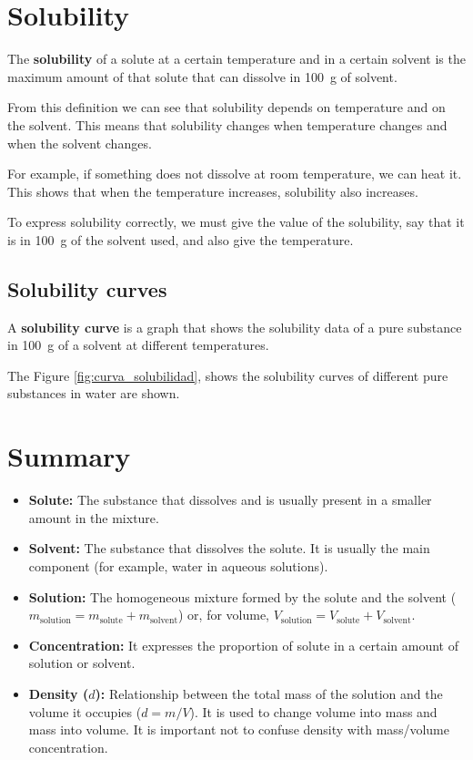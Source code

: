 \section{Solubility}

\begin{definition}[Solubility]
        The \textbf{solubility} of a solute at a certain temperature and in a certain solvent is the maximum amount of that solute that can dissolve in \qty{100}{\g} of solvent.
\end{definition}

From this definition we can see that solubility depends on temperature and on the solvent.
This means that solubility changes when temperature changes and when the solvent changes.

For example, if something does not dissolve at room temperature, we can heat it.
This shows that when the temperature increases, solubility also increases.

To express solubility correctly, we must give the value of the solubility, say that it is in \qty{100}{\g} of the solvent used, and also give the temperature.

\subsection{Solubility curves}\label{subsec:curvas-de-solubilidad}

A \textbf{solubility curve} is a graph that shows the solubility data of a pure substance in \qty{100}{\g} of a solvent at different temperatures.

The Figure \ref{fig:curva_solubilidad}, shows the solubility curves of different pure substances in water are shown.

\section*{Summary}
\begin{itemize}
    \item \textbf{Solute:} The substance that dissolves and is usually present in a smaller amount in the mixture.
    \item \textbf{Solvent:} The substance that dissolves the solute. It is usually the main component (for example, water in aqueous solutions).
    \item \textbf{Solution:} The homogeneous mixture formed by the solute and the solvent ($m_{\text{solution}} = m_{\text{solute}} + m_{\text{solvent}}$) or, for volume, \( V_{\text{solution}} = V_{\text{solute}} + V_{\text{solvent}} \).
    \item \textbf{Concentration:} It expresses the proportion of solute in a certain amount of solution or solvent.
    \item \textbf{Density ($d$):} Relationship between the total mass of the solution and the volume it occupies ($d = m/V$). It is used to change volume into mass and mass into volume. It is important not to confuse density with mass/volume concentration.
\end{itemize}

